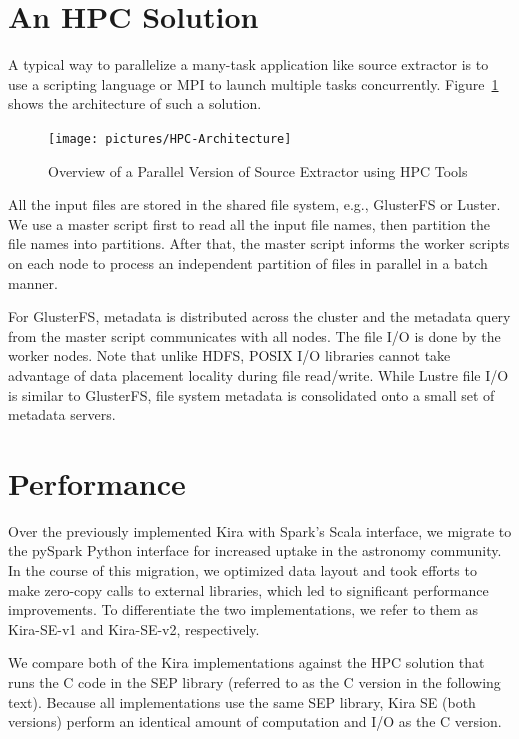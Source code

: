 \documentclass[10pt,journal,compsoc]{IEEEtran}
\begin{document}
\section{An HPC Solution}
\label{sec:HPC}
A typical way to parallelize a many-task application like source extractor is to use a scripting language
or MPI to launch multiple tasks concurrently. Figure~\ref{fig:hpc-architecture} shows the architecture
of such a solution.

\begin{figure}[t]
	\begin{center}
		\texttt{[image: pictures/HPC-Architecture]}
		\caption{Overview of a Parallel Version of Source Extractor using HPC Tools}
		\label{fig:hpc-architecture}
  	\end{center}
\end{figure}

All the input files are stored in the shared file system, e.g., GlusterFS or Luster. We use a master script
first to read all the input file names, then partition the file names into partitions. After that, the master
script informs the worker scripts on each node to process an independent partition of files in parallel 
in a batch manner.

For GlusterFS, metadata is distributed across the cluster and the metadata query from the master script
communicates with all nodes. The file I/O is done by the worker nodes. Note that unlike HDFS, 
POSIX I/O libraries cannot take advantage of data placement locality during file read/write. While Lustre 
file I/O is similar to GlusterFS, file system metadata is consolidated onto a small set of metadata servers.

\section{Performance}
\label{sec:Performance}
Over the previously implemented Kira with Spark's Scala interface, we migrate to the pySpark Python interface 
for increased uptake in the astronomy community. In the course of this migration, we optimized data layout and took efforts to make zero-copy calls to external libraries, which led to significant performance improvements. To differentiate the two implementations,
we refer to them as Kira-SE-v1 and Kira-SE-v2, respectively.

We compare both of the Kira implementations against the HPC solution that runs
the C code in the SEP library (referred to as the C version in the following text). 
Because all implementations use the same SEP library, Kira SE (both versions) 
perform an identical amount of computation and I/O as the C version.
\end{document}

